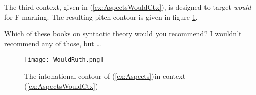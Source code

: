 \documentclass[
]{RCL}
\begin{document}
The third context, given in (\ref{ex:AspectsWouldCtx}), is designed to target \textit{would} for F-marking.
The resulting pitch contour is given in figure \ref{fig:WouldRuth}.
\begin{exe}	
\ex\label{ex:AspectsWouldCtx}
\begin{xlist}
	 Which of these books on syntactic theory would you recommend?
	 I wouldn’t recommend any of those, but \dots
\end{xlist}
\end{exe}
\begin{figure}[h]
	\centering
	\texttt{[image: WouldRuth.png]}
	\caption{The intonational contour of (\ref{ex:Aspects})in context (\ref{ex:AspectsWouldCtx})}
	\label{fig:WouldRuth}
\end{figure}
\FloatBarrier

\nocite{mikkelsen2004specifying}


\end{document}
